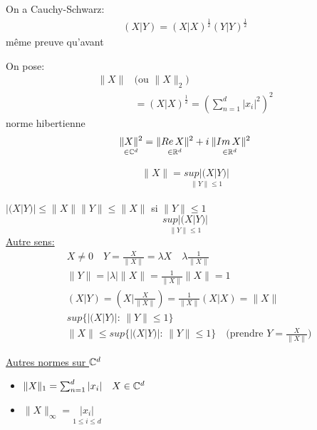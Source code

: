 \documentclass[a4paper]{report}
\begin{document}
\begin{explanation}
    On a Cauchy-Schwarz:
    \begin{align*}
        (X|Y) = (X|X)^{\frac{1}{2}}(Y|Y)^{\frac{1}{2}}
    \end{align*}
    même preuve qu'avant
\end{explanation}
On pose:
\begin{align*}
    \|X\| & \text{(ou }\|X\|_2\text{)}\\
          &= (X|X)^{\frac{1}{2}} = ( \sum_{n=1}^{d} |x_i|^2 )^2
\end{align*}
norme hibertienne
\[
    \underset{\in \mathbb{C}^d}{\|X\|^2} = \underset{\in \mathbb{R}^d}{\|Re\,X\|^2} + i\underset{\in \mathbb{R}^d}{\:\|Im\,X\|^2}\\
\] 
\begin{lemma}
   \begin{align*}
       \|X\| = \underset{\|Y\|\le 1}{sup|(X|Y)|}
   \end{align*} 
\end{lemma}
\begin{explanation}
    $|(X|Y)| \le \|X\|\|Y\| \le \|X\|$ si $\|Y\| \le 1$
    \[
    \underset{\|Y\|\le 1}{sup|(X|Y)|}
    \] 
    \underline{Autre sens:} 
    \begin{align*}
        &X \neq 0 \quad Y =  \frac{X}{\|X\|} = \lambda X \quad \lambda \frac{1}{\|X\|}\\
        &\|Y\| = |\lambda|\|X\| = \frac{1}{\|X\|}\|X\| = 1\\
        &(X|Y) = (X|\frac{X}{\|X\|}) = \frac{1}{\|X\|}(X|X) = \|X\|\\
        &sup \{|(X|Y)|: \, \|Y\| \le  1\}\\
        &\|X\| \le sup \{|(X|Y)|: \, \|Y\|\le 1\} \quad \text{(prendre }Y = \frac{X}{\|X\|}\text{)}
    \end{align*}

\end{explanation}
\underline{Autres normes sur $\mathbb{C}^d$}
\begin{itemize}
    \item $\|X\|_1 = \sum_{n=1}^{d} |x_i| \quad X \in \mathbb{C}^d$
    \item $\|X\|_{\infty} = \underset{1\le i \le d}{|x_i|}$
\end{itemize}
\end{document}
